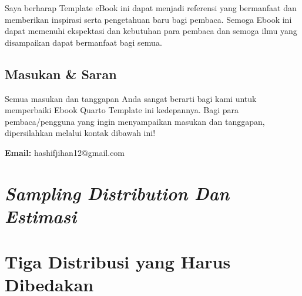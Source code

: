 \documentclass[
  indonesian,
  letterpaper,
]{book}
\begin{document}
Saya berharap Template eBook ini dapat menjadi referensi yang bermanfaat
dan memberikan inspirasi serta pengetahuan baru bagi pembaca. Semoga
Ebook ini dapat memenuhi ekspektasi dan kebutuhan para pembaca dan
semoga ilmu yang disampaikan dapat bermanfaat bagi semua.

\section*{Masukan \& Saran}\label{masukan-saran}


Semua masukan dan tanggapan Anda sangat berarti bagi kami untuk
memperbaiki Ebook Quarto Template ini kedepannya. Bagi para
pembaca/pengguna yang ingin menyampaikan masukan dan tanggapan,
dipersilahkan melalui kontak dibawah ini!

\textbf{Email:} hashifjihan12@gmail.com


\chapter{\texorpdfstring{\emph{Sampling Distribution Dan
Estimasi}}{Sampling Distribution Dan Estimasi}}\label{sampling-distribution-dan-estimasi}


\chapter{Tiga Distribusi yang Harus
Dibedakan}\label{tiga-distribusi-yang-harus-dibedakan}
\end{document}
